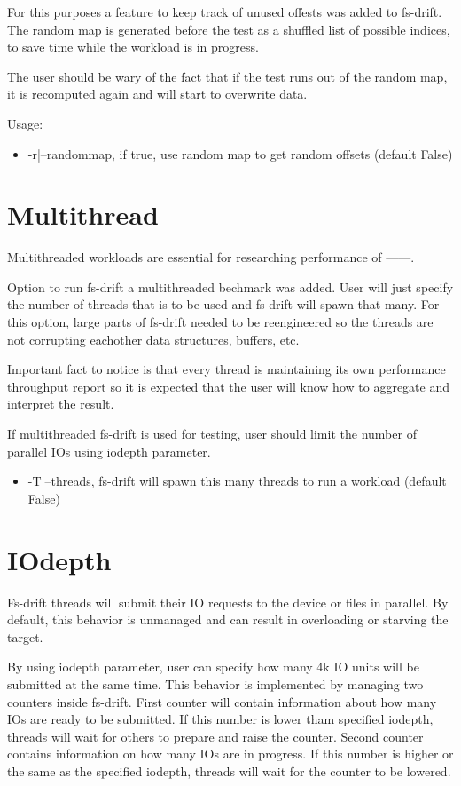 \documentclass[
  color, %
  table, %
  lof,   %
  lot,   %
]{fithesis3}
\begin{document}
For this purposes a feature to keep track of unused offests was added to fs-drift. The random map is generated before the test as a shuffled list of possible indices, to save time while the workload is in progress.

The user should be wary of the fact that if the test runs out of the random map, it is recomputed again and will start to overwrite data.

Usage:
\begin{itemize}
    \item -r|--randommap, if true, use random map to get random offsets (default False)
\end{itemize}

\section{Multithread}
Multithreaded workloads are essential for researching performance of ------.

Option to run fs-drift a multithreaded bechmark was added. User will just specify the number of threads that is to be used and fs-drift will spawn that many. For this option, large parts of fs-drift needed to be reengineered so the threads are not corrupting eachother data structures, buffers, etc.

Important fact to notice is that every thread is maintaining its own performance throughput report so it is expected that the user will know how to aggregate and interpret the result.

If multithreaded fs-drift is used for testing, user should limit the number of parallel IOs using iodepth parameter.


\begin{itemize}
    \item -T|--threads, fs-drift will spawn this many threads to run a workload (default False)
\end{itemize}

\section{IOdepth}
Fs-drift threads will submit their IO requests to the device or files in parallel. By default, this behavior is unmanaged and can result in overloading or starving the target.

By using iodepth parameter, user can specify how many 4k IO units will be submitted at the same time. This behavior is implemented by managing two counters inside fs-drift. First counter will contain information about how many IOs are ready to be submitted. If this number is lower tham specified iodepth, threads will wait for others to prepare and raise the counter. Second counter contains information on how many IOs are in progress. If this number is higher or the same as the specified iodepth, threads will wait for the counter to be lowered.
\end{document}
